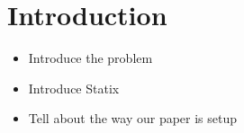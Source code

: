 \section{Introduction}
\begin{itemize}
    \item Introduce the problem
    \item Introduce Statix
    \item Tell about the way our paper is setup
\end{itemize}